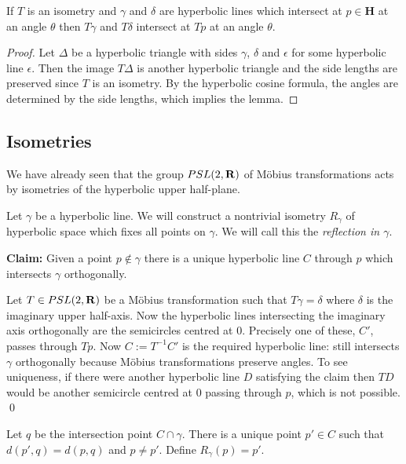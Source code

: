 \documentclass[12pt]{article}
\begin{document}
\begin{cor}
  If $T$ is an isometry and $\gamma$ and $\delta$ are hyperbolic lines which intersect at $p\in\mathbf{H}$ at an angle $\theta$ then $T\gamma$ and $T\delta$ intersect at $Tp$ at an angle $\theta$.
\end{cor}
\begin{proof}
  Let $\Delta$ be a hyperbolic triangle with sides $\gamma$, $\delta$ and $\epsilon$ for some hyperbolic line $\epsilon$. Then the image $T\Delta$ is another hyperbolic triangle and the side lengths are preserved since $T$ is an isometry. By the hyperbolic cosine formula, the angles are determined by the side lengths, which implies the lemma.
\end{proof}


\subsection{Isometries}

\begin{exm}[$PSL(2,\RR)$]
  We have already seen that the group $PSL(2,\RR)$ of M\"obius transformations acts by isometries of the hyperbolic upper half-plane.
\end{exm}

\begin{exm}
  Let $\gamma$ be a hyperbolic line. We will construct a nontrivial isometry $R_\gamma$ of hyperbolic space which fixes all points on $\gamma$. We will call this the {\em reflection in $\gamma$}.

  {\bf Claim:} Given a point $p\not\in\gamma$ there is a unique hyperbolic line $C$ through $p$ which intersects $\gamma$ orthogonally.
  
  Let $T\in PSL(2,\mathbf{R})$ be a M\"obius transformation such that $T\gamma=\delta$ where $\delta$ is the imaginary upper half-axis. Now the hyperbolic lines intersecting the imaginary axis orthogonally are the semicircles centred at $0$. Precisely one of these, $C'$, passes through $Tp$. Now $C:=T^{-1}C'$ is the required hyperbolic line: still intersects $\gamma$ orthogonally because M\"obius transformations preserve angles. To see uniqueness, if there were another hyperbolic line $D$ satisfying the claim then $TD$ would be another semicircle centred at $0$ passing through $p$, which is not possible. \qed

  Let $q$ be the intersection point $C\cap\gamma$. There is a unique point $p'\in C$ such that $d(p',q)=d(p,q)$ and $p\neq p'$. Define $R_\gamma(p)=p'$.
\end{exm}
\end{document}
